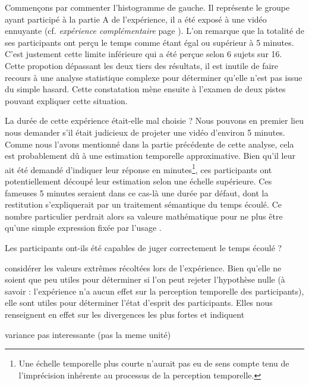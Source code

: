 \documentclass[12pt,fleqn,oneside,openany]{book} %
\begin{document}
Commençons par commenter l'histogramme de gauche. Il représente le groupe ayant participé à la partie A de l'expérience, il a été exposé à une vidéo ennuyante (cf. \emph{expérience complémentaire} page \pageref{ssec:exp2.2}). L'on remarque que la totalité de ses participants ont perçu le temps comme étant égal ou supérieur à 5 minutes. C'est justement cette limite inférieure qui a été perçue selon 6 sujets sur 16. Cette propotion dépassant les deux tiers des résultats, il est inutile de faire recours à une analyse statistique complexe pour déterminer qu'elle n'est pas issue du simple hasard. Cette constatation mène ensuite à l'examen de deux pistes pouvant expliquer cette situation.

La durée de cette expérience était-elle mal choisie ? Nous pouvons en premier lieu nous demander s'il était judicieux de projeter une vidéo d'environ 5 minutes. Comme nous l'avons mentionné dans la partie précédente de cette analyse, cela est probablement dû à une estimation temporelle approximative. Bien qu'il leur ait été demandé d'indiquer leur réponse en minutes\footnote{Une échelle temporelle plus courte n'aurait pas eu de sens compte tenu de l'imprécision inhérente au processus de la perception temporelle.}, ces participants ont potentiellement découpé leur estimation selon une échelle supérieure. Ces fameuses 5 minutes seraient dans ce cas-là une durée par défaut, dont la restitution s'expliquerait par un traitement sémantique du temps écoulé. Ce nombre particulier perdrait alors sa valeure mathématique pour ne plus être qu'une simple expression fixée par l'usage \cite{durand1970}.

Les participants ont-ils été capables de juger correctement le temps écoulé ?

considérer les valeurs extrêmes récoltées lors de l'expérience. Bien qu'elle ne soient que peu utiles pour déterminer si l'on peut rejeter l'hypothèse nulle (à savoir : l'expérience n'a aucun effet sur la perception temporelle des participants), elle sont utiles pour déterminer l'état d'esprit des participants. Elles nous renseignent en effet sur les divergences les plus fortes et indiquent 

variance pas interessante (pas la meme unité) 
\end{document}
